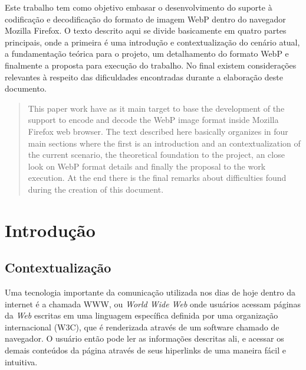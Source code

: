 \documentclass[espaco=simples,appendix=Name]{abnt}
\begin{document}
\capa
\folhaderosto
\listoffigures
\listoftables

\sumario

\newcommand{\ingles}[1]{\textsl{#1}}
\newcommand{\bibTeX}{bib\kern-.13ex\TeX}

\begin{resumo}
Este trabalho tem como objetivo embasar o desenvolvimento do suporte à codificação e decodificação do formato de imagem WebP dentro do navegador Mozilla Firefox. O texto descrito aqui se divide basicamente em quatro partes principais, onde a primeira é uma introdução e contextualização do cenário atual, a fundamentação teórica para o projeto, um detalhamento do formato WebP e finalmente a proposta para execução do trabalho. No final existem considerações relevantes à respeito das dificuldades encontradas durante a elaboração deste documento.
\end{resumo}

\begin{abstract}
This paper work have as it main target to base the development of the support to encode and decode the WebP image format inside Mozilla Firefox web browser. The text described here basically organizes in four main sections where the first is an introduction and an contextualization of the current scenario, the theoretical foundation to the project, an close look on WebP format details and finally the proposal to the work execution. At the end there is the final remarks about difficulties found during the creation of this document.
\end{abstract}

\onehalfspacing

\chapter{Introdução}

\section{Contextualização}

Uma tecnologia importante da comunicação utilizada nos dias de hoje dentro da internet é a chamada WWW, ou \ingles{World Wide Web} onde usuários acessam páginas da \ingles{Web} escritas em uma linguagem específica definida por uma organização internacional (W3C), que é renderizada através de um software chamado de navegador. O usuário então pode ler as informações descritas ali, e acessar os demais conteúdos da página através de seus hiperlinks de uma maneira fácil e intuitiva.
\end{document}
